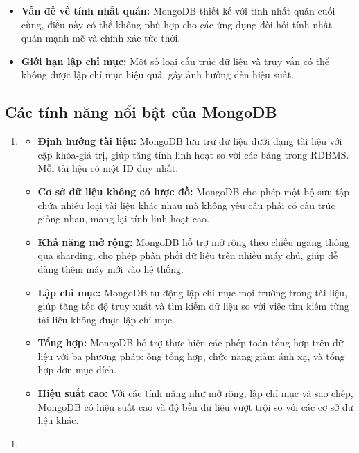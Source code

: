 \begin{enumerate}
\begin{itemize}[left=0.5cm]
        \item[-] \textbf{Vấn đề về tính nhất quán:} MongoDB thiết kế với tính nhất quán cuối cùng, điều này có thể không phù hợp cho các ứng dụng đòi hỏi tính nhất quán mạnh mẽ và chính xác tức thời.

        \item[-] \textbf{Giới hạn lập chỉ mục:} Một số loại cấu trúc dữ liệu và truy vấn có thể không được lập chỉ mục hiệu quả, gây ảnh hưởng đến hiệu suất.

    \end{itemize}
\end{enumerate}
\subsection{Các tính năng nổi bật của MongoDB}
\begin{enumerate}
    \item []
    \begin{itemize}[left=0.5cm]
    \item[$\bullet$]\textbf{Định hướng tài liệu:} MongoDB lưu trữ dữ liệu dưới dạng tài liệu với cặp khóa-giá trị, giúp tăng tính linh hoạt so với các bảng trong RDBMS. Mỗi tài liệu có một ID duy nhất.
    
    \item[$\bullet$]\textbf{Cơ sở dữ liệu không có lược đồ:} MongoDB cho phép một bộ sưu tập chứa nhiều loại tài liệu khác nhau mà không yêu cầu phải có cấu trúc giống nhau, mang lại tính linh hoạt cao.

    \item[$\bullet$] \textbf{Khả năng mở rộng:} MongoDB hỗ trợ mở rộng theo chiều ngang thông qua sharding, cho phép phân phối dữ liệu trên nhiều máy chủ, giúp dễ dàng thêm máy mới vào hệ thống.

    \item[$\bullet$] \textbf{Lập chỉ mục:} MongoDB tự động lập chỉ mục mọi trường trong tài liệu, giúp tăng tốc độ truy xuất và tìm kiếm dữ liệu so với việc tìm kiếm từng tài liệu không được lập chỉ mục.

    \item[$\bullet$]\textbf{Tổng hợp:} MongoDB hỗ trợ thực hiện các phép toán tổng hợp trên dữ liệu với ba phương pháp: ống tổng hợp, chức năng giảm ánh xạ, và tổng hợp đơn mục đích.

    \item[$\bullet$]\textbf{Hiệu suất cao:} Với các tính năng như mở rộng, lập chỉ mục và sao chép, MongoDB có hiệu suất cao và độ bền dữ liệu vượt trội so với các cơ sở dữ liệu khác.\cite{noauthor_top_2021_features_db}
\end{itemize}
\end{enumerate}
\newpage
\begin{enumerate}
    \item []

\end{enumerate}
